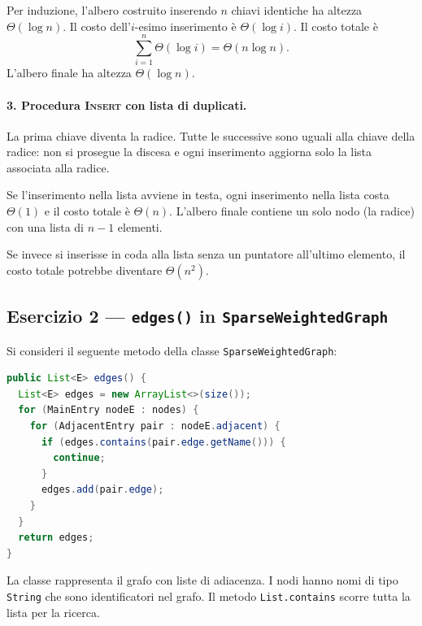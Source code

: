 Per induzione, l'albero costruito inserendo $n$ chiavi identiche ha altezza $\Theta(\log n)$.
Il costo dell'$i$-esimo inserimento è $\Theta(\log i)$. Il costo totale è
\[
\sum_{i=1}^{n} \Theta(\log i) = \Theta(n \log n).
\]
L'albero finale ha altezza $\Theta(\log n)$.

\paragraph{3. Procedura \textsc{Insert} con lista di duplicati.}
La prima chiave diventa la radice. Tutte le successive sono uguali alla chiave della radice:
non si prosegue la discesa e ogni inserimento aggiorna solo la lista associata alla radice.

Se l'inserimento nella lista avviene in testa, ogni inserimento nella lista costa $\Theta(1)$
e il costo totale è $\Theta(n)$. L'albero finale contiene un solo nodo (la radice) con una
lista di $n-1$ elementi.

\begin{osservazione}
	Se invece si inserisse in coda alla lista senza un puntatore all'ultimo elemento, il
	costo totale potrebbe diventare $\Theta(n^2)$.
\end{osservazione}

\subsection{Esercizio 2 --- \texttt{edges()} in \texttt{SparseWeightedGraph}}
\label{sub:es2-sparse-graph}

Si consideri il seguente metodo della classe \texttt{SparseWeightedGraph}:

\begin{lstlisting}[language=Java, caption={Versione originale di \texttt{edges()}}]
public List<E> edges() {
  List<E> edges = new ArrayList<>(size());
  for (MainEntry nodeE : nodes) {
    for (AdjacentEntry pair : nodeE.adjacent) {
      if (edges.contains(pair.edge.getName())) {
        continue;
      }
      edges.add(pair.edge);
    }
  }
  return edges;
}
\end{lstlisting}

La classe rappresenta il grafo con liste di adiacenza. I nodi hanno nomi di tipo
\texttt{String} che sono identificatori nel grafo. Il metodo \texttt{List.contains} scorre
tutta la lista per la ricerca.

